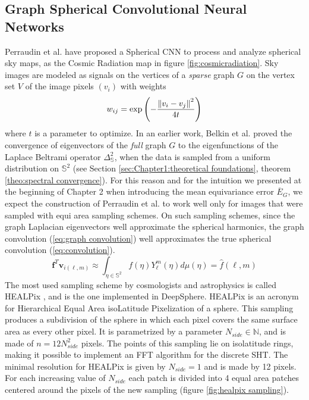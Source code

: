 \subsection{Graph Spherical Convolutional Neural Networks} \label{sec:Chapter1:DeepSphere}
Perraudin et al. \cite{DeepSphere} have proposed a Spherical CNN to process and analyze spherical sky maps, as the Cosmic Radiation map in figure \ref{fig:cosmicradiation}. Sky images are modeled as signals on the vertices of a \textit{sparse} graph $G$ on the vertex set $V$ of the image pixels $(v_i)$ with weights
$$
w_{ij}=\exp \left(-\frac{\left\lVert v_i-v_j\right\rVert^2}{4t}\right)
$$
where $t$ is a parameter to optimize. In an earlier work, Belkin et al. \cite{NIPS2006_2989} proved the convergence of eigenvectors of the \textit{full} graph $G$ to the eigenfunctions of the Laplace Beltrami operator $\Delta_\mathbb S^2$, when the data is sampled from a uniform distribution on $\mathbb S^2$ (see Section \ref{sec:Chapter1:theoretical foundations}, theorem \ref{theo:spectral convergence}). For this reason and for the intuition we presented at the beginning of Chapter 2 when introducing the mean equivariance error $\overline E_G$, we expect the construction of Perraudin et al. to work well only for images that were sampled with equi area sampling schemes. On such sampling schemes, since the graph Laplacian eigenvectors well approximate the spherical harmonics, the graph convolution (\ref{eq:graph convolution}) well approximates the true spherical convolution (\ref{eq:convolution}).
\begin{equation}\label{eq:approx}
\mathbf f^T\mathbf v_{i(\ell, m)} \approx \int_{\eta \in \mathbb S^2}f(\eta)Y_\ell^m(\eta)d\mu(\eta)=\hat f(\ell,m)
\end{equation}
The most used sampling scheme by cosmologists and astrophysics is called HEALPix \cite{HEALPix}, and is the one implemented in DeepSphere. HEALPix is an acronym for Hierarchical Equal Area isoLatitude Pixelization of a sphere. This sampling produces a subdivision of the sphere in which each pixel covers the same surface area as every other pixel. It is parametrized by a parameter $N_{side}\in\mathbb N$, and is made of $n=12N_{side}^2$ pixels. The points of this sampling lie on isolatitude rings, making it possible to implement an FFT algorithm for the discrete SHT. The minimal resolution for HEALPix is given by $N_{side}=1$ and is made by 12 pixels. For each increasing value of $N_{side}$ each patch is divided into 4 equal area patches centered around the pixels of the new sampling (figure \ref{fig:healpix sampling}).

